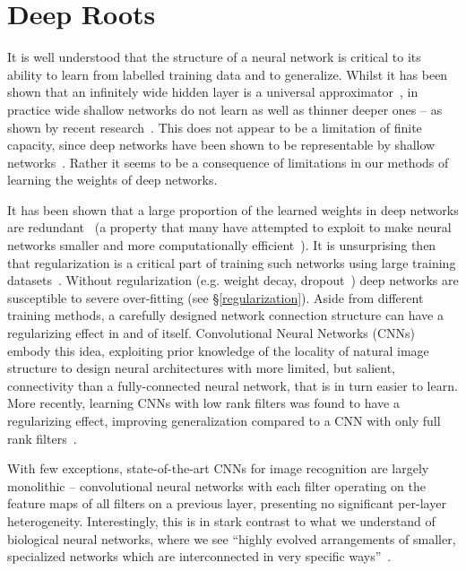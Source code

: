 \documentclass[thesis]{subfiles}
\begin{document}
	
	\chapter{Deep Roots}
	\label{deeproots}
	
	
	It is well understood that the structure of a neural network is critical to its ability to learn from labelled training data and to generalize. Whilst it has been shown that an infinitely wide hidden layer is a universal approximator~\citep{hornik89a}, in practice wide shallow networks do not learn as well as thinner deeper ones -- as shown by recent research~\citep{conf/nips/KrizhevskySH12,Szegedy2014going,Simonyan2014verydeep,He2015}.
	This does not appear to be a limitation of finite capacity, since deep networks have been shown to be representable by shallow networks~\citep{Ba2013dothey}. Rather it seems to be a consequence of limitations in our methods of learning the weights of deep networks.
	
	It has been shown that a large proportion of the learned weights in deep networks are redundant~\citep{Denil2013predicting} (a property that many have attempted to exploit to make neural networks smaller and more computationally efficient~\cite{Szegedy2014going,Denton2014efficient}). It is unsurprising then that regularization is a critical part of training such networks using large training datasets~\cite{conf/nips/KrizhevskySH12}. Without regularization (e.g. weight decay, dropout~\cite{1207.0580v1}) deep networks are susceptible to severe over-fitting (see \S\ref{regularization}). Aside from different training methods, a carefully designed network connection structure can have a regularizing effect in and of itself. Convolutional Neural Networks (CNNs)~\citep{Fuk80,Lecun1998} embody this idea, exploiting prior knowledge of the locality of natural image structure to design neural architectures with more limited, but salient, connectivity than a fully-connected neural network, that is in turn easier to learn. More recently, learning CNNs with low rank filters was found to have a regularizing effect, improving generalization compared to a CNN with only full rank filters~\citep{Ioannou2015lowrank}.
	
	With few exceptions, state-of-the-art CNNs for image recognition are largely monolithic -- convolutional neural networks with each filter operating on the feature maps of all filters on a previous layer, presenting no significant per-layer heterogeneity. Interestingly, this is in stark contrast to what we understand of biological neural networks, where we see ``highly evolved arrangements of smaller, specialized networks which are interconnected in very specific ways''~\citep{minsky1988perceptrons}.
	
\end{document}
